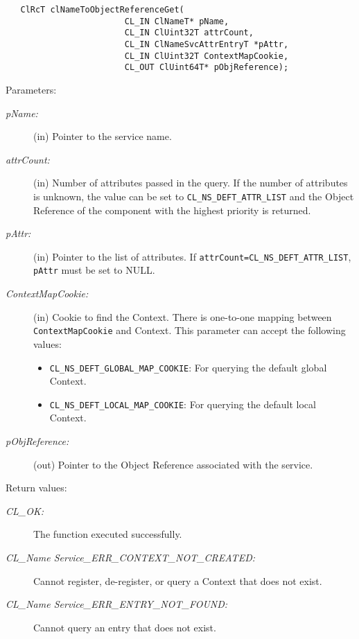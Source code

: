 \begin{flushleft}
\begin{Desc}
\footnotesize\begin{verbatim}   ClRcT clNameToObjectReferenceGet( 
						CL_IN ClNameT* pName, 
						CL_IN ClUint32T attrCount, 
						CL_IN ClNameSvcAttrEntryT *pAttr, 
						CL_IN ClUint32T ContextMapCookie, 
						CL_OUT ClUint64T* pObjReference); 
\end{verbatim}
\normalsize
\end{Desc}
\begin{Desc}
\item[Parameters:]
\begin{description}
\item[{\em p\-Name:}](in) Pointer to the service name.
\item[{\em attr\-Count:}](in) Number of attributes passed in the query. If the number of attributes is unknown, the value can be set to 
{\tt{CL\_\-NS\_\-DEFT\_\-ATTR\_\-LIST}} and the Object Reference of the component with the highest priority is returned.
\item[{\em p\-Attr:}](in) Pointer to the list of attributes. If {\tt{attrCount=CL\_\-NS\_\-DEFT\_\-ATTR\_\-LIST}}, {\tt{pAttr}} must be set to NULL. 
\item[{\em Context\-Map\-Cookie:}](in) Cookie to find the Context. There is one-to-one mapping between {\tt{ContextMapCookie}} and Context. This parameter can 
accept the following values: 
\begin{itemize}
\item
{\tt{CL\_\-NS\_\-DEFT\_\-GLOBAL\_\-MAP\_\-COOKIE}}: For querying the default global Context. 
\item
{\tt{CL\_\-NS\_\-DEFT\_\-LOCAL\_\-MAP\_\-COOKIE}}: For querying the default local Context.  
\end{itemize}
\item[{\em p\-Obj\-Reference:}](out) Pointer to the Object Reference associated with the service. 
\end{description}
\end{Desc}
\begin{Desc}
\item[Return values:]
\begin{description}
\item[{\em CL\_\-OK:}]The function executed successfully. 
\item[{\em CL\_\-Name Service\_\-ERR\_\-CONTEXT\_\-NOT\_\-CREATED:}]Cannot register, de-register, or query a Context that does not exist.
\item[{\em CL\_\-Name Service\_\-ERR\_\-ENTRY\_\-NOT\_\-FOUND:}]Cannot query an entry that does not exist.

\end{description}
\end{Desc}
\end{flushleft}
